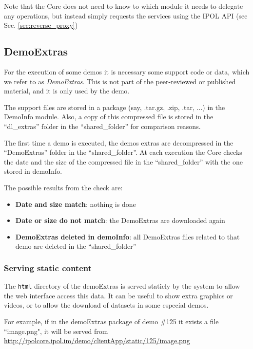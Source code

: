 Note that the Core does not need to know to which module it needs to delegate any operations, but instead simply requests the services using the IPOL API (see Sec. \ref{sec:reverse_proxy})

\subsection{DemoExtras}
\label{sec:demoextras} 
For the execution of some demos it is necessary some support code or data, which we refer to as \emph{DemoExtras}. This is not part of the peer-reviewed or published material, and it is only used by the demo.

The support files are stored in a package (say, .tar.gz, .zip, .tar, ...) in the DemoInfo module. Also, a copy of this compressed file is stored in the ``dl\_extras'' folder in the ``shared\_folder'' for comparison reasons. 

The first time a demo is executed, the demos extras are decompressed in the ``DemoExtras'' folder in the ``shared\_folder''. At each execution the Core checks the date and the size of the compressed file in the ``shared\_folder'' with the one stored in demoInfo. 

The possible results from the check are:
\begin{itemize}
    \item \textbf{Date and size match}: nothing is done
    \item \textbf{Date or size do not match}: the DemoExtras are downloaded again
    \item \textbf{DemoExtras deleted in demoInfo}: all DemoExtras files related to that demo are deleted in the ``shared\_folder''
\end{itemize}

\subsubsection{Serving static content}
The {\tt html} directory of the demoExtras is served staticly by the system to allow the web interface access this data. It can be useful to show extra graphics or videos, or to allow the download of datasets in some especial demos.

For example, if in the demoExtras package of demo \#125 it exists a file ``image.png", it will be served from \url{http://ipolcore.ipol.im/demo/clientApp/static/125/image.png}


